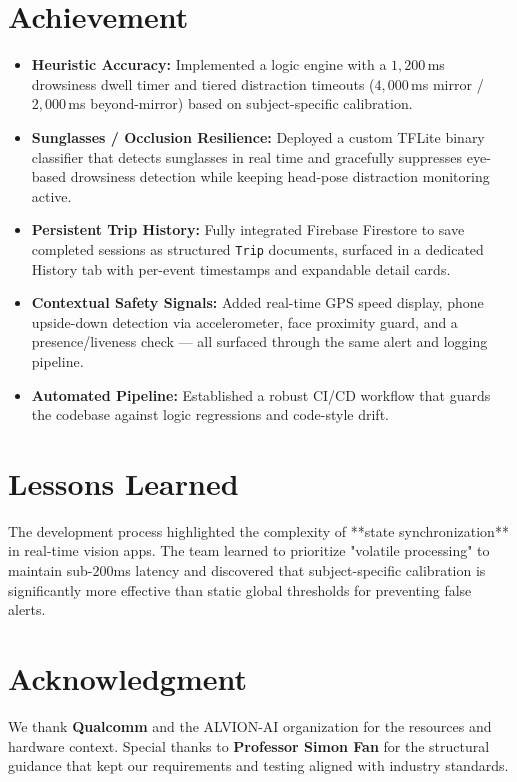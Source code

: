 \documentclass[11pt]{report}
\begin{document}
\section{Achievement}
\begin{itemize}
    \item \textbf{Heuristic Accuracy:} Implemented a logic engine with a $1{,}200$\,ms drowsiness dwell timer and tiered distraction timeouts ($4{,}000$\,ms mirror / $2{,}000$\,ms beyond-mirror) based on subject-specific calibration.
    \item \textbf{Sunglasses / Occlusion Resilience:} Deployed a custom TFLite binary classifier that detects sunglasses in real time and gracefully suppresses eye-based drowsiness detection while keeping head-pose distraction monitoring active.
    \item \textbf{Persistent Trip History:} Fully integrated Firebase Firestore to save completed sessions as structured \texttt{Trip} documents, surfaced in a dedicated History tab with per-event timestamps and expandable detail cards.
    \item \textbf{Contextual Safety Signals:} Added real-time GPS speed display, phone upside-down detection via accelerometer, face proximity guard, and a presence/liveness check — all surfaced through the same alert and logging pipeline.
    \item \textbf{Automated Pipeline:} Established a robust CI/CD workflow that guards the codebase against logic regressions and code-style drift.
\end{itemize}

\section{Lessons Learned}
The development process highlighted the complexity of **state synchronization** in real-time vision apps. The team learned to prioritize "volatile processing" to maintain sub-$200$ms latency and discovered that subject-specific calibration is significantly more effective than static global thresholds for preventing false alerts.

\section{Acknowledgment}
We thank \textbf{Qualcomm} and the ALVION-AI organization for the resources and hardware context. Special thanks to \textbf{Professor Simon Fan} for the structural guidance that kept our requirements and testing aligned with industry standards.
\end{document}

